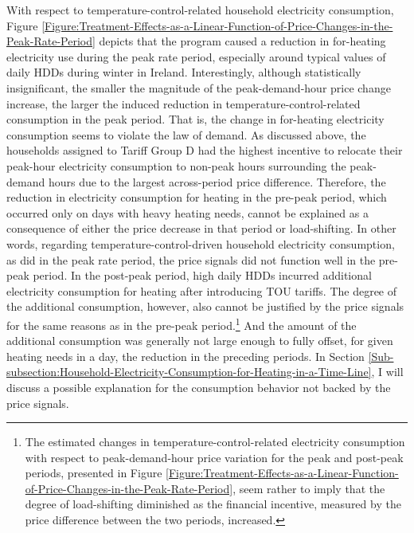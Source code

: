 With respect to temperature-control-related household electricity consumption, Figure \ref{Figure:Treatment-Effects-as-a-Linear-Function-of-Price-Changes-in-the-Peak-Rate-Period} depicts that the program caused a reduction in for-heating electricity use during the peak rate period, especially around typical values of daily HDDs during winter in Ireland. Interestingly, although statistically insignificant, the smaller the magnitude of the peak-demand-hour price change increase, the larger the induced reduction in temperature-control-related consumption in the peak period. That is, the change in for-heating electricity consumption seems to violate the law of demand. As discussed above, the households assigned to Tariff Group D had the highest incentive to relocate their peak-hour electricity consumption to non-peak hours surrounding the peak-demand hours due to the largest across-period price difference. Therefore, the reduction in electricity consumption for heating in the pre-peak period, which occurred only on days with heavy heating needs, cannot be explained as a consequence of either the price decrease in that period or load-shifting. In other words, regarding temperature-control-driven household electricity consumption, as did in the peak rate period, the price signals did not function well in the pre-peak period. In the post-peak period, high daily HDDs incurred additional electricity consumption for heating after introducing TOU tariffs. The degree of the additional consumption, however, also cannot be justified by the price signals for the same reasons as in the pre-peak period.\footnote{The estimated changes in temperature-control-related electricity consumption with respect to peak-demand-hour price variation for the peak and post-peak periods, presented in Figure \ref{Figure:Treatment-Effects-as-a-Linear-Function-of-Price-Changes-in-the-Peak-Rate-Period}, seem rather to imply that the degree of load-shifting diminished as the financial incentive, measured by the price difference between the two periods, increased.} And the amount of the additional consumption was generally not large enough to fully offset, for given heating needs in a day, the reduction in the preceding periods. In Section \ref{Sub-subsection:Household-Electricity-Consumption-for-Heating-in-a-Time-Line}, I will discuss a possible explanation for the consumption behavior not backed by the price signals. 

